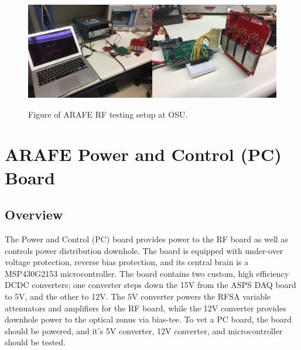 \documentclass[letter,12pt]{article}
\begin{document}
\begin{figure}
\begin{centering}
\includegraphics[width=0.5\textwidth]{photos/IMG_1212.jpg}\includegraphics[width=0.5\textwidth]{photos/IMG_1214.jpg}
\par\end{centering}
\caption{Figure of ARAFE RF testing setup at OSU.}
\label{arafe-test-setup}
\end{figure}

\section{ARAFE Power and Control (PC) Board}

\subsection{Overview}

The Power and Control (PC) board provides power to the RF board as well as controls power distribution downhole. The board is equipped with under-over voltage protection, reverse bias protection, and its central brain is a MSP430G2153 microcontroller. The board contains two custom, high efficiency DCDC converters; one converter steps down the 15V from the ASPS DAQ board to 5V, and the other to 12V. The 5V converter powers the RFSA variable attenuators and amplifiers for the RF board, while the 12V converter provides downhole power to the optical zonus via bias-tee. To vet a PC board, the board should be powered, and it's 5V converter, 12V converter, and microcontroller
should be tested.
\end{document}
